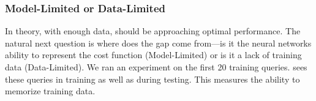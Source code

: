 \subsubsection{Model-Limited or Data-Limited}
In theory, with enough data, \sys should be approaching optimal performance.
The natural next question is where does the gap come from---is it the neural networks ability to represent the cost function (Model-Limited) or is it a lack of training data (Data-Limited).
We ran an experiment on the first 20 training queries. \sys sees these queries in training as well as during testing. This measures the ability to memorize training data.




